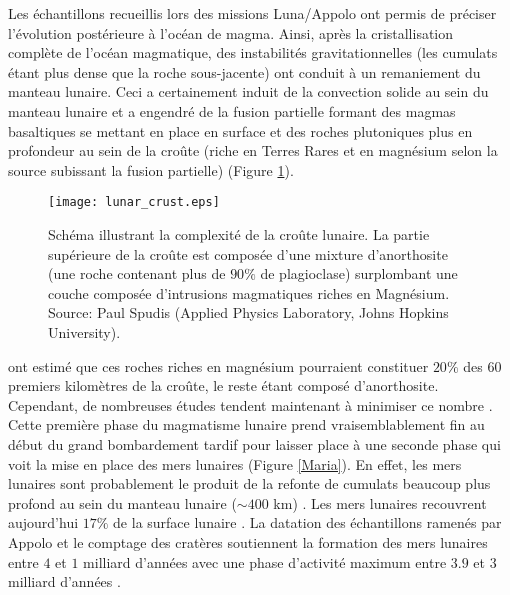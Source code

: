 Les échantillons  recueillis lors des missions  Luna/Appolo ont permis
de préciser l'évolution postérieure à  l'océan de magma.  Ainsi, après
la cristallisation  complète de  l'océan magmatique,  des instabilités
gravitationnelles  (les  cumulats  étant   plus  dense  que  la  roche
sous-jacente) ont conduit à un remaniement du manteau lunaire.  Ceci a
certainement induit de la convection solide au sein du manteau lunaire
et a engendré de la fusion partielle formant des magmas basaltiques se
mettant  en  place  en  surface  et des  roches  plutoniques  plus  en
profondeur au sein de la croûte (riche en Terres Rares et en magnésium
selon la source subissant  la fusion partielle) \citep{Shearer:2006gg}
(Figure \ref{C1-LunarCrust}).
\begin{figure}[h!]
  \begin{center}
    \graphicspath{ {/Users/thorey/Documents/These/Manuscript/Figure/Chapter1/} }
    \texttt{[image: lunar\_crust.eps]}
    \caption{Schéma illustrant la complexité  de la croûte lunaire. La
      partie  supérieure  de  la  croûte est  composée  d'une  mixture
      d'anorthosite   (une  roche   contenant   plus   de  $90\%$   de
      plagioclase)  surplombant   une  couche   composée  d'intrusions
      magmatiques riches  en Magnésium.  Source: Paul  Spudis (Applied
      Physics Laboratory, Johns Hopkins University).}
    \label{C1-LunarCrust}
  \end{center}
\end{figure}
\citet{Taylor:1982hx} ont  estimé que  ces roches riches  en magnésium
pourraient  constituer  $20\%$  des  $60$ premiers  kilomètres  de  la
croûte,  le   reste  étant   composé  d'anorthosite.    Cependant,  de
nombreuses   études  tendent   maintenant   à   minimiser  ce   nombre
\citep{Jolliff:2000vf}.   Cette première  phase du  magmatisme lunaire
prend vraisemblablement fin au début du grand bombardement tardif pour
laisser place à une  seconde phase qui voit la mise  en place des mers
lunaires  (Figure  \ref{Maria}).  En  effet,  les  mers lunaires  sont
probablement  le  produit de  la  refonte  de cumulats  beaucoup  plus
profond    au   sein    du   manteau    lunaire   ($\sim    400$   km)
\citep{Shearer:2006gg}.   Les  mers  lunaires  recouvrent  aujourd'hui
$17\%$ de  la surface  lunaire \citep{Hiesinger:2006cb}.   La datation
des  échantillons  ramenés par  Appolo  et  le comptage  des  cratères
soutiennent la formation  des mers lunaires entre $4$  et $1$ milliard
d'années avec une phase d'activité maximum entre $3.9$ et $3$ milliard
d'années \citep{Hiesinger:2010ke}.
 
